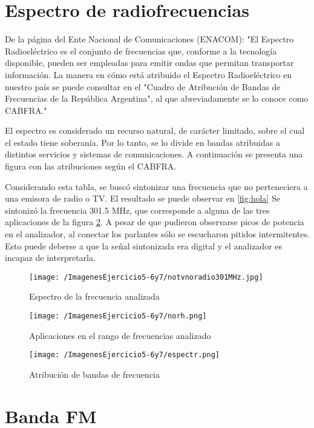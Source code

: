 \section{Espectro de radiofrecuencias}
De la página del Ente Nacional de Comunicaciones (ENACOM): "El Espectro Radioeléctrico es el conjunto de frecuencias que, conforme a la tecnología disponible, pueden ser empleadas para emitir ondas que permitan transportar información. La manera en cómo está atribuido el Espectro Radioeléctrico en nuestro país se puede consultar en el "Cuadro de Atribución de Bandas de Frecuencias de la República Argentina", al que abreviadamente se lo conoce como CABFRA."

El espectro es considerado un recurso natural, de carácter limitado,  sobre el cual el estado tiene soberanía. Por lo tanto, se lo divide en bandas atribuidas a distintos servicios y sistemas de comunicaciones. A continuación se presenta una figura con las atribuciones según el CABFRA. 

Considerando esta tabla, se buscó sintonizar una frecuencia que no perteneciera a una emisora de radio o TV. El resultado se puede observar en \ref{fig:hola} Se sintonizó la frecuencia 301.5 MHz, que corresponde a alguna de las tres aplicaciones de la figura \ref{fig:noradionitelev}. A pesar de que pudieron observarse picos de potencia en el analizador, al conectar los parlantes sólo se escucharon pitidos intermitentes. Esto puede deberse a que la señal sintonizada era digital y el analizador es incapaz de interpretarla.

\begin{figure}[H]
	\centering
	\texttt{[image: /ImagenesEjercicio5-6y7/notvnoradio301MHz.jpg]}
\caption{Espectro de la frecuencia analizada}
	\label{fig:hello}
\end{figure}

\begin{figure}[H]
	\centering
	\texttt{[image: /ImagenesEjercicio5-6y7/norh.png]}
\caption{Aplicaciones en el rango de frecuencias analizado}
	\label{fig:noradionitelev}
\end{figure}

\begin{figure}[H]
	\centering
	\texttt{[image: /ImagenesEjercicio5-6y7/espectr.png]}
\caption{Atribución de bandas de frecuencia}
	\label{fig:esqcond}
\end{figure}

\section{Banda FM}

